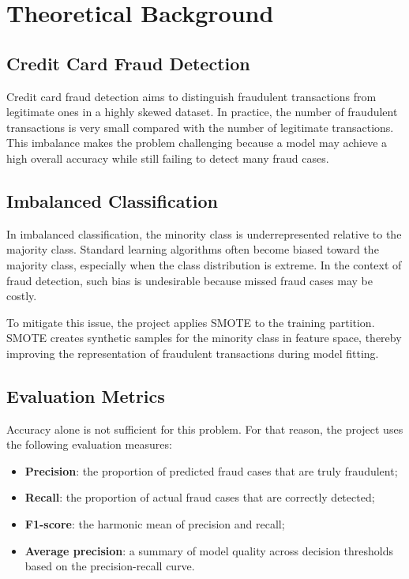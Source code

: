 \documentclass[12pt,a4paper]{report}
\begin{document}
\chapter{Theoretical Background}
\section{Credit Card Fraud Detection}
Credit card fraud detection aims to distinguish fraudulent transactions from legitimate ones in a highly skewed dataset. In practice, the number of fraudulent transactions is very small compared with the number of legitimate transactions. This imbalance makes the problem challenging because a model may achieve a high overall accuracy while still failing to detect many fraud cases.

\section{Imbalanced Classification}
In imbalanced classification, the minority class is underrepresented relative to the majority class. Standard learning algorithms often become biased toward the majority class, especially when the class distribution is extreme. In the context of fraud detection, such bias is undesirable because missed fraud cases may be costly.

To mitigate this issue, the project applies SMOTE to the training partition. SMOTE creates synthetic samples for the minority class in feature space, thereby improving the representation of fraudulent transactions during model fitting.

\section{Evaluation Metrics}
Accuracy alone is not sufficient for this problem. For that reason, the project uses the following evaluation measures:
\begin{itemize}
    \item \textbf{Precision}: the proportion of predicted fraud cases that are truly fraudulent;
    \item \textbf{Recall}: the proportion of actual fraud cases that are correctly detected;
    \item \textbf{F1-score}: the harmonic mean of precision and recall;
    \item \textbf{Average precision}: a summary of model quality across decision thresholds based on the precision-recall curve.
\end{itemize}
\end{document}
